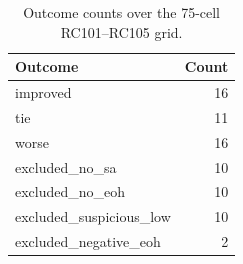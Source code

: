 \begin{table}[t]
\centering
\caption{Outcome counts over the 75-cell RC101--RC105 grid.}
\label{tab:outcome-counts}
\small
\begin{tabular}{lr}
\toprule
Outcome & Count \\
\midrule
improved & 16 \\
tie & 11 \\
worse & 16 \\
excluded\_no\_sa & 10 \\
excluded\_no\_eoh & 10 \\
excluded\_suspicious\_low & 10 \\
excluded\_negative\_eoh & 2 \\
\bottomrule
\end{tabular}
\end{table}
